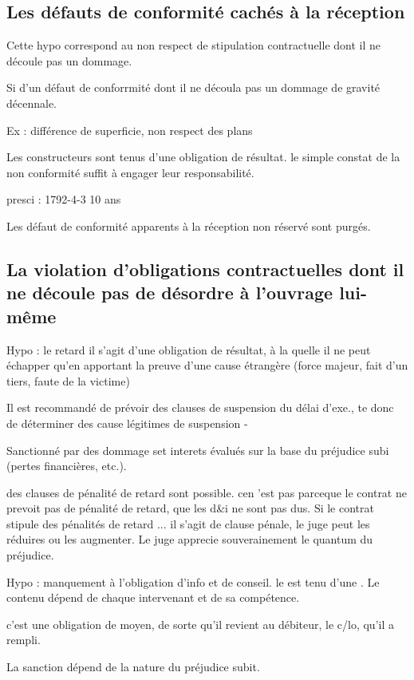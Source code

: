 	\subsection{Les défauts de conformité cachés à la réception}

		Cette hypo correspond au non respect de stipulation contractuelle dont il ne découle pas un dommage.

		Si d'un défaut de conforrmité dont il ne découla pas un dommage de gravité décennale.

		Ex : différence de superficie, non respect des plans

		Les constructeurs sont tenus d'une obligation de résultat. le simple constat de la non conformité suffit à engager leur responsabilité.

		presci : 1792-4-3 10 ans

		Les défaut de conformité apparents à la réception non réservé sont purgés.

	\subsection{La violation d'obligations contractuelles dont il ne découle pas de désordre à l'ouvrage lui-même}

		Hypo : le retard
		il s'agit d'une obligation de résultat, à la quelle il  ne peut échapper qu'en apportant la preuve d'une cause étrangère (force majeur, fait d'un tiers, faute de la victime)

		Il est recommandé de prévoir des clauses de suspension du délai d'exe., te donc de déterminer des cause légitimes de suspension -

		Sanctionné par des dommage set interets évalués sur la base du préjudice subi (pertes financières, etc.).

		des clauses de pénalité de retard sont possible. cen 'est pas parceque le contrat ne prevoit pas de pénalité de retard, que les d\&i ne sont pas dus. Si le contrat stipule des pénalités de retard ... il s'agit de clause pénale, le juge peut les réduires ou les augmenter. Le juge apprecie souverainement le quantum du préjudice.

		Hypo : manquement à l'obligation d'info et de conseil. le \lo est tenu d'une . Le contenu dépend de chaque intervenant et de sa compétence.

		c'est une obligation de moyen, de sorte qu'il revient au débiteur, le c/lo, qu'il a rempli.

		La sanction dépend de la nature du préjudice subit.

